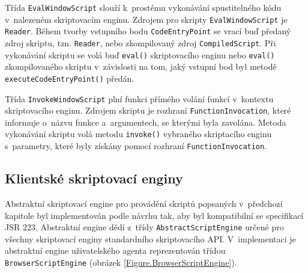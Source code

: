 Třída \texttt{EvalWindowScript} slouží k~prostému vykonávání spustitelného kódu v~nalezeném skriptovacím enginu. Zdrojem pro skripty \texttt{EvalWindowScript} je \texttt{Reader}. Během tvorby vstupního bodu \texttt{CodeEntryPoint} se vrací buď předaný zdroj skriptu, tzn. \texttt{Reader}, nebo zkompilovaný zdroj \texttt{CompiledScript}. Při vykonávání skriptu se volá buď \texttt{eval()} skriptovacího enginu nebo \texttt{eval()} zkompilovaného skriptu v~závislosti na tom, jaký vstupní bod byl metodě \texttt{executeCodeEntryPoint()} předán.

Třída \texttt{InvokeWindowScript} plní funkci přímého volání funkcí v~kontextu skriptovacího enginu. Zdrojem skriptu je rozhraní \texttt{FunctionInvocation}, které informuje o~názvu funkce a~argumentech, se kterými byla zavolána. Metoda vykonávání skriptu volá metodu \texttt{invoke()} vybraného skriptacího enginu s~parametry, které byly získány pomocí rozhraní \texttt{FunctionInvocation}.

\subsection{Klientské skriptovací enginy}
\label{Chapter.Implementation.ScriptEngines}

Abstraktní skriptovací engine pro provádění skriptů popsaných v~předchozí kapitole byl implementován podle návrhu tak, aby byl kompatibilní se specifikací JSR 223. Abstraktní engine dědí z~třídy \texttt{AbstractScriptEngine} určené pro všechny skriptovací enginy standardního skriptovacího API. V~implementaci je abstraktní engine uživatelského agenta reprezentován třídou \texttt{BrowserScriptEngine} (obrázek \ref{Figure.BrowserScriptEngine}).


